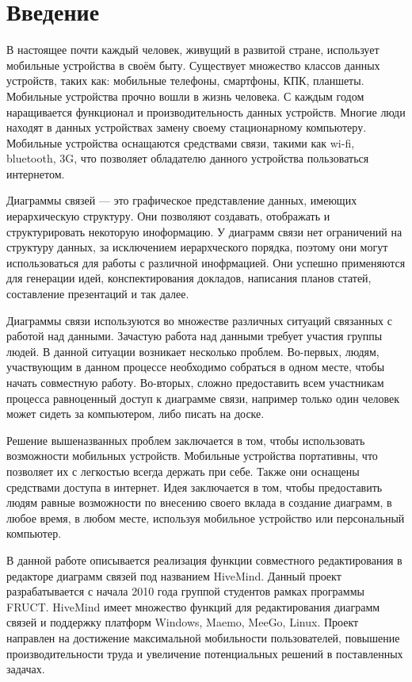 \newpage

\chapter*{Введение}
\label{chap:introduction}

В настоящее почти каждый человек, живущий в развитой стране, использует
мобильные устройства в своём быту. Существует множество классов данных
устройств, таких как: мобильные телефоны, смартфоны, КПК, планшеты. Мобильные
устройства прочно вошли в жизнь человека. С каждым годом наращивается функционал
и производительность данных устройств. Многие люди находят в данных устройствах
замену своему стационарному компьютеру. Мобильные устройства оснащаются
средствами связи, такими как wi-fi, bluetooth, 3G, что позволяет обладателю
данного устройства пользоваться интернетом.

Диаграммы связей --- это графическое представление данных, имеющих
иерархическую структуру. Они позволяют создавать, отображать и
структурировать некоторую иноформацию. У диаграмм связи нет ограничений на
структуру данных, за исключением иерархческого порядка, поэтому они могут
использоваться для работы с различной инофрмацией. Они успешно
применяются для генерации идей, конспектирования докладов, написания планов
статей, составление презентаций и так далее.

Диаграммы связи используются во множестве различных ситуаций связанных с работой
над данными. Зачастую работа над данными требует участия группы людей. В данной
ситуации возникает несколько проблем. Во-первых, людям, участвующим в данном
процессе необходимо собраться в одном месте, чтобы начать совместную работу.
Во-вторых, сложно предоставить всем участникам процесса равноценный доступ к
диаграмме связи, например только один человек может сидеть за компьютером, либо
писать на доске.

Решение вышеназванных проблем заключается в том, чтобы использовать возможности
мобильных устройств. Мобильные устройства портативны, что позволяет их с
легкостью всегда держать при себе. Также они оснащены средствами доступа в
интернет. Идея заключается в том, чтобы предоставить людям равные возможности по
внесению своего вклада в создание диаграмм, в любое время, в любом месте,
используя мобильное устройство или персональный компьютер.

В данной работе описывается реализация функции совместного редактирования в
редакторе диаграмм связей под названием HiveMind. Данный проект разрабатывается
с начала 2010 года группой студентов рамках программы FRUCT. HiveMind имеет
множество функций для редактирования диаграмм связей и поддержку платформ
Windows, Maemo, MeeGo, Linux. Проект направлен на достижение максимальной
мобильности пользователей, повышение производительности труда и увеличение
потенциальных решений в поставленных задачах.

